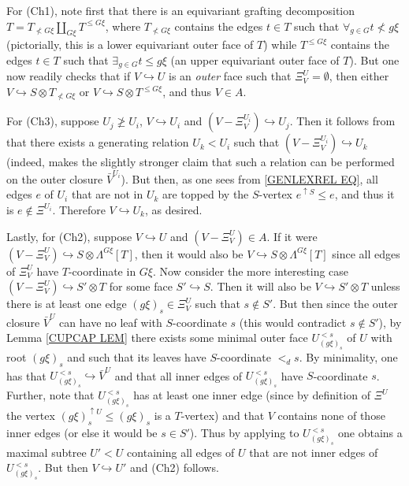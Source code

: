 \documentclass[a4paper,10pt
]{article}%
\begin{document}
\begin{example}
For (Ch1), note first that there is an equivariant grafting decomposition
$T = T_{\not < G\xi} \amalg_{G \xi} T^{\leq G\xi}$, 
where $T_{\not < G\xi}$ contains the edges $t \in T$ such that
$\forall_{g \in G} t \not < g\xi$ (pictorially, this is a lower equivariant outer face of $T$) 
while $T^{\leq G\xi}$
contains the edges $t \in T$ such that
$\exists_{g \in G} t \leq g\xi$ (an upper equivariant outer face of $T$).
But one now readily checks that if
$V \hookrightarrow U$ is an \textit{outer} face such that
$\Xi^U_V = \emptyset$, then either 
$V \hookrightarrow S \otimes T_{\not < G\xi}$ or 
$V \hookrightarrow S \otimes T^{\leq G\xi}$, and thus $V \in A$.

For (Ch3), suppose $U_j \not \geq U_i$, 
$V \hookrightarrow U_i$ and
$(V - \Xi^{U_i}_V) \hookrightarrow U_j$.
Then it follows from \cite[Lemma 7.37]{Per17}
that there exists a generating relation $U_k < U_i$
such that $(V - \Xi^{U_i}_V) \hookrightarrow U_k$
(indeed, \cite[Lemma 7.37]{Per17} makes the slightly stronger claim that such a relation can be performed on the outer closure $\bar{V}^{U_i}$). But then, as one sees from \eqref{GENLEXREL EQ},
all edges $e$ of $U_i$ that are not in $U_k$ are topped by the $S$-vertex $e^{\uparrow S}\leq e$, and thus it is $e \not \in \Xi^{U_i}$. Therefore $V \hookrightarrow U_k$, as desired.

Lastly, for (Ch2), suppose $V \hookrightarrow U$ and 
$(V - \Xi^{U}_V) \in A$.
If it were 
$(V-\Xi^{U}_V) \hookrightarrow S \otimes \Lambda^{G \xi}[T]$, then it would also be 
$V \hookrightarrow S \otimes \Lambda^{G \xi}[T]$
since all edges of $\Xi^{U}_V$ have 
$T$-coordinate in $G\xi$.
Now consider the more interesting case
$(V - \Xi^{U}_V) \hookrightarrow S' \otimes T$
for some face $S' \hookrightarrow S$.
Then it will also be 
$V \hookrightarrow S' \otimes T$
unless there is at least one edge
$(g \xi)_s \in \Xi^{U}_V$ such that $s \not \in S'$.
But then since the outer closure $\bar{V}^U$ can have no leaf with $S$-coordinate $s$ (this would contradict $s \not \in S'$), 
by Lemma \ref{CUPCAP LEM} there exists some minimal outer face $U_{(g\xi)_s}^{<s}$ of $U$ with root $(g\xi)_s$ and such that its leaves have $S$-coordinate $<_d s$.
By minimality, one has that $U_{(g\xi)_s}^{<s} \hookrightarrow \bar{V}^U$ and that all inner edges of $U_{(g\xi)_s}^{<s}$ have
$S$-coordinate $s$.
Further, note that $U_{(g\xi)_s}^{<s}$
has at least one inner edge
(since by definition of $\Xi^U$ the vertex 
$(g \xi)_s^{\uparrow U} \leq (g \xi)_s$ is a $T$-vertex)
and that $V$ contains none of those inner edges (or else it would be $s \in S'$).
Thus by applying \cite[Lemma 7.34]{Per17}
to $U_{(g\xi)_s}^{<s}$ one obtains a maximal subtree $U' < U$
containing all edges of $U$ that are not inner edges of $U_{(g\xi)_s}^{<s}$.
But then $V \hookrightarrow U'$ and (Ch2) follows.
\end{example}
\end{document}
